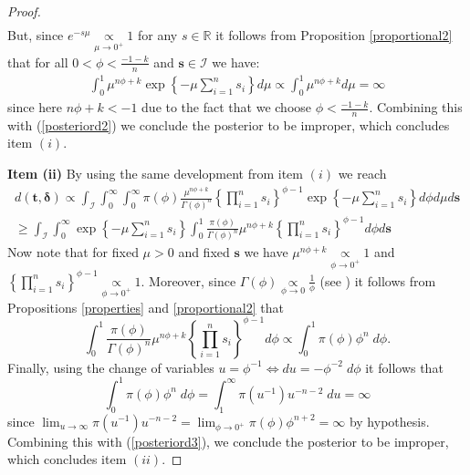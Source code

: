 \documentclass[12pt]{article} %
\newcommand{\R}{\mathbb{R}}
\theoremstyle{plain}%
\theoremstyle{definition}
\theoremstyle{remark}
\begin{document}
\begin{proof}
\begin{equation}
\begin{aligned}
\end{aligned}
\end{equation}
But, since $e^{-s\mu} \underset{\mu \to 0^+}{\propto} 1$ for any $s\in\R$ it follows from Proposition \ref{proportional2} that for all $0<\phi<\frac{-1-k}{n}$ and $\boldsymbol{s}\in \mathcal{I}$ we have:
\begin{equation*}
 \begin{aligned}
\int_0^1 \mu^{n\phi+k}\exp\left\{-\mu\sum_{i=1}^n s_i\right\} d\mu
\propto \int_0^1 \mu^{n\phi+k} d\mu = \infty
\end{aligned}
\end{equation*}
since here $n\phi+k<-1$ due to the fact that we choose $\phi<\frac{-1-k}{n}$. Combining this with (\ref{posteriord2}) we conclude the posterior to be improper, which concludes item $(i)$.

\vspace{0.3cm}
\noindent \textbf{Item (ii)} By using the same development from item $(i)$ we reach
 \begin{equation}
 \begin{aligned}
 \label{posteriord3}
d(\boldsymbol{t,\delta})\propto \int_{\mathcal{I}} \int_{0}^{\infty}\int_{0}^{\infty}\pi(\phi)\frac{\mu^{n\phi+k}}{\Gamma(\phi)^n}\left\{\prod_{i=1}^n{s_i}\right\}^{\phi-1}\exp\left\{-\mu\sum_{i=1}^n s_i\right\}d\phi d\mu d\boldsymbol{s} \\
\geq \int_{\mathcal{I}} \int_{0}^{\infty}\exp\left\{-\mu\sum_{i=1}^n s_i\right\}     \int_{0}^{1}\frac{\pi(\phi)}{\Gamma(\phi)^n}\mu^{n\phi+k}\left\{\prod_{i=1}^n{s_i}\right\}^{\phi-1} d\phi  d\boldsymbol{s}
\end{aligned}
\end{equation}
Now note that for fixed $\mu>0$ and fixed $\boldsymbol{s}$ we have $\mu^{n\phi+k}\underset{\phi\to 0^+}{\propto} 1$ and $\left\{\prod_{i=1}^n{s_i}\right\}^{\phi-1}\underset{\phi\to 0^+}{\propto} 1$. Moreover, since $\Gamma(\phi)\underset{\phi \to 0}{\propto} \frac{1}{\phi}$ (see  \cite{abramowitz}) it follows from Propositions \ref{properties} and \ref{proportional2} that
\begin{equation*}
\int_{0}^{1}\frac{\pi(\phi)}{\Gamma(\phi)^n}\mu^{n\phi+k}\left\{\prod_{i=1}^n{s_i}\right\}^{\phi-1} d\phi  \propto \int_{0}^{1}\pi(\phi)\phi^n\; d\phi.
\end{equation*}
Finally, using the change of variables $u=\phi^{-1}\Leftrightarrow du=-\phi^{-2}\; d\phi$ it follows that
\begin{equation*} \int_{0}^{1}\pi(\phi)\phi^n\; d\phi = \int_1^\infty \pi(u^{-1})u^{-n-2}\; du = \infty
\end{equation*}
since $\lim_{u\to \infty} \pi(u^{-1})u^{-n-2} = \lim_{\phi\to 0^+} \pi(\phi)\phi^{n+2} = \infty$ by hypothesis. Combining this with (\ref{posteriord3}), we conclude the posterior to be improper, which concludes item $(ii)$.


\end{proof}
\end{document}
